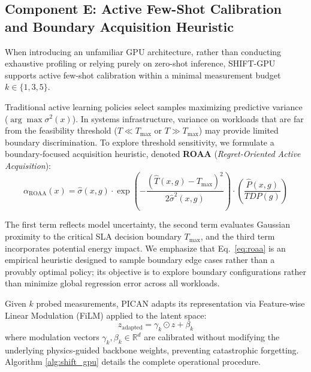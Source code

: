 \documentclass[preprint,12pt]{elsarticle}
\begin{document}
\subsection{Component E: Active Few-Shot Calibration and Boundary Acquisition Heuristic}
When introducing an unfamiliar GPU architecture, rather than conducting exhaustive profiling or relying purely on zero-shot inference, SHIFT-GPU supports active few-shot calibration within a minimal measurement budget $k \in \{1, 3, 5\}$.

Traditional active learning policies select samples maximizing predictive variance ($\arg\max \sigma^2(x)$). In systems infrastructure, variance on workloads that are far from the feasibility threshold ($T \ll T_{\max}$ or $T \gg T_{\max}$) may provide limited boundary discrimination. To explore threshold sensitivity, we formulate a boundary-focused acquisition heuristic, denoted \textbf{ROAA} (\textit{Regret-Oriented Active Acquisition}):
\begin{equation}
\label{eq:roaa}
\alpha_{\text{ROAA}}(x) = \hat{\sigma}(x, g) \cdot \exp\left( - \frac{(\hat{T}(x, g) - T_{\max})^2}{2 \hat{\sigma}^2(x, g)} \right) \cdot \left(\frac{\hat{P}(x, g)}{TDP(g)}\right)
\end{equation}

The first term reflects model uncertainty, the second term evaluates Gaussian proximity to the critical SLA decision boundary $T_{\max}$, and the third term incorporates potential energy impact. We emphasize that Eq.~\eqref{eq:roaa} is an empirical heuristic designed to sample boundary edge cases rather than a provably optimal policy; its objective is to explore boundary configurations rather than minimize global regression error across all workloads. 

Given $k$ probed measurements, PICAN adapts its representation via Feature-wise Linear Modulation (FiLM) \citep{perez2018film} applied to the latent space:
\begin{equation}
z_{\text{adapted}} = \gamma_k \odot z + \beta_k
\end{equation}
where modulation vectors $\gamma_k, \beta_k \in \mathbb{R}^d$ are calibrated without modifying the underlying physics-guided backbone weights, preventing catastrophic forgetting. Algorithm \ref{alg:shift_gpu} details the complete operational procedure.
\end{document}
